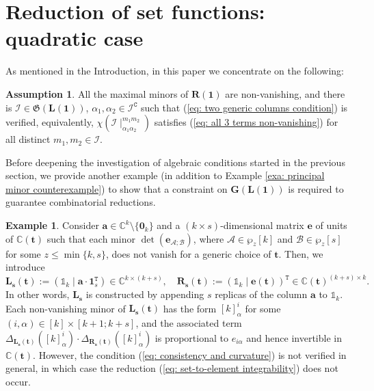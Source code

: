 \documentclass[10pt]{article}
\newcommand{\idd}{\mathbb{1}}
\theoremstyle{remark}%
\theoremstyle{definition}%
\newtheorem{assumption}{Assumption}%
\newtheorem{example}{Example}%
\begin{document}
\section{\label{sec: All three-terms non-vanishing} Reduction of set functions: quadratic case}
As mentioned in the Introduction, in this paper we concentrate on the following:
\begin{assumption}
\label{claim: generic matrices} All the maximal minors of $\mathbf{R}(\mathbf{1})$ are non-vanishing, and there is $\mathcal{I}\in\mathfrak{G}(\mathbf{L}(\mathbf{1}))$, $\alpha_{1},\alpha_{2}\in\mathcal{I}^{\mathtt{C}}$ such that (\ref{eq: two generic columns condition}) is verified, equivalently,  $\chi(\mathcal{I}\mid_{\alpha_{1}\alpha_{2}}^{m_{1}m_{2}})$ satisfies (\ref{eq: all 3 terms non-vanishing}) for all distinct $m_{1},m_{2}\in\mathcal{I}$. 
\end{assumption} 
Before deepening the investigation of algebraic conditions started in the previous section, we provide another example (in addition to Example \ref{exa: principal minor counterexample}) to show that a constraint on $\mathbf{G}(\mathbf{L}(\mathbf{1}))$ is required to guarantee combinatorial reductions. 
\begin{example}
\label{exa: non-projectively extensional, no bound} Consider $\mathbf{a}\in\mathbb{C}^{k}\setminus\{\mathbf{0}_{k}\}$ and a $(k\times s)$-dimensional matrix $\mathbf{e}$ of units of $\mathbb{C}(\mathbf{t})$ such that each minor $\det(\mathbf{e}_{\mathcal{A};\mathcal{B}})$, where $\mathcal{A}\in\wp_{z}[k]$ and $\mathcal{B}\in\wp_{z}[s]$ for some $z\leq \min\{k,s\}$, does not vanish for a generic choice of $\mathbf{t}$. Then, we introduce
\begin{equation*}
\mathbf{L_{s}}(\mathbf{t}) :=  \left(\idd_{k}\mid\mathbf{a}\cdot \mathbf{1}_{s}^{\mathtt{T}}\right)\in\mathbb{C}^{k\times(k+s)},
\quad
\mathbf{R_{s}}(\mathbf{t}) := \left(\idd_{k}\mid\mathbf{e}(\mathbf{t})\right)^{\mathtt{T}}\in\mathbb{C}(\mathbf{t})^{(k+s)\times k}.
\end{equation*}
In other words, $\mathbf{L_{s}}$ is constructed by appending $s$ replicas of the column $\mathbf{a}$ to $\idd_{k}$. Each non-vanishing minor of $\mathbf{L_{s}}(\mathbf{t})$ has the form $[k]_{\alpha}^{i}$ for some $(i,\alpha)\in[k]\times[k+1;k+s]$, and the associated term $\Delta_{\mathbf{L_{s}}(\mathbf{t})}([k]_{\alpha}^{i})\cdot\Delta_{\mathbf{R_{s}}(\mathbf{t})}([k]_{\alpha}^{i})$ is proportional to $e_{i\alpha}$ and hence invertible in $\mathbb{C}(\mathbf{t})$. However, the condition (\ref{eq: consistency and curvature}) is not verified in general, in which case the reduction (\ref{eq: set-to-element integrability}) does not occur. 
\end{example}
\end{document}

